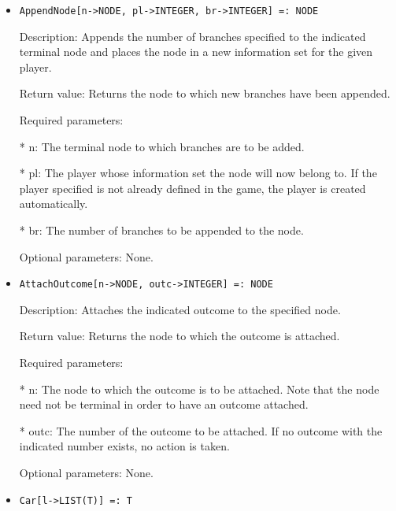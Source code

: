 \begin{itemize}

\item
\begin{verbatim}
AppendNode[n->NODE, pl->INTEGER, br->INTEGER] =: NODE
\end{verbatim}

\bd
\item
[Description:] Appends the number of branches specified to the
indicated terminal node and places the node in a new information set
for the given player.
\item
[Return value:] Returns the node to which new branches have been appended.
\item
[Required parameters:]\hfil\null
\par
\bd
\item
[* n:] The terminal node to which branches are to be added.
\item
[* pl:] The player whose information set the node will now belong to.
If the player specified is not already defined in the game, the player
is created automatically. 
\item
[* br:] The number of branches to be appended to the node.
\ed

\item
[Optional parameters:] None.
\ed

\item
\begin{verbatim}
AttachOutcome[n->NODE, outc->INTEGER] =: NODE
\end{verbatim}

\bd
\item
[Description:] Attaches the indicated outcome to the specified node.
\item
[Return value:] Returns the node to which the outcome is attached.
\item
[Required parameters:]\hfil\null

\bd
\item
[* n:] The node to which the outcome is to be attached.  Note that the
node need not be terminal in order to have an outcome attached.
\item
[* outc:] The number of the outcome to be attached.  If no outcome
with the indicated number exists, no action is taken.  
\ed

\item
[Optional parameters:] None.
\ed

\item

\begin{verbatim}
Car[l->LIST(T)] =: T	
\end{verbatim}


\end{itemize}
